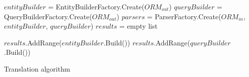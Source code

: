 \begin{algorithm}[!htp]
    \footnotesize
    \DontPrintSemicolon

    

    $entityBuilder$ = EntityBuilderFactory.Create($ORM_{out}$)\;
    $queryBuilder$ = QueryBuilderFactory.Create($ORM_{out}$)\;
    $parsers$ = ParserFactory.Create($ORM_{in}$, $entityBuilder$, $queryBuilder$)\;
    $results$ = empty list\;
    

    $results$.AddRange($entityBuilder$.Build())\;
     {
        $results$.AddRange($queryBuilder$.Build())\;
    }
    
    \caption{Translation algorithm}
    \label{alg:translation_alg}
\end{algorithm}